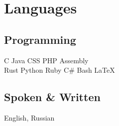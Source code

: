 \documentclass[]{deedy-resume-openfont}
\begin{document}
\section{Languages}
\begin{minipage}[t]{.4\textwidth}
\subsection{Programming}
C \textbullet{} Java \textbullet{} CSS \textbullet{} PHP \textbullet{} Assembly \\
Rust \textbullet{} Python \textbullet{} Ruby \textbullet{} C\# \textbullet{} Bash \textbullet{} \LaTeX
\sectionsep
\end{minipage}
\hfill
\begin{minipage}[t]{.35\textwidth}
\subsection{Spoken \& Written}
 English, Russian\\
\end{minipage}
\end{document}
